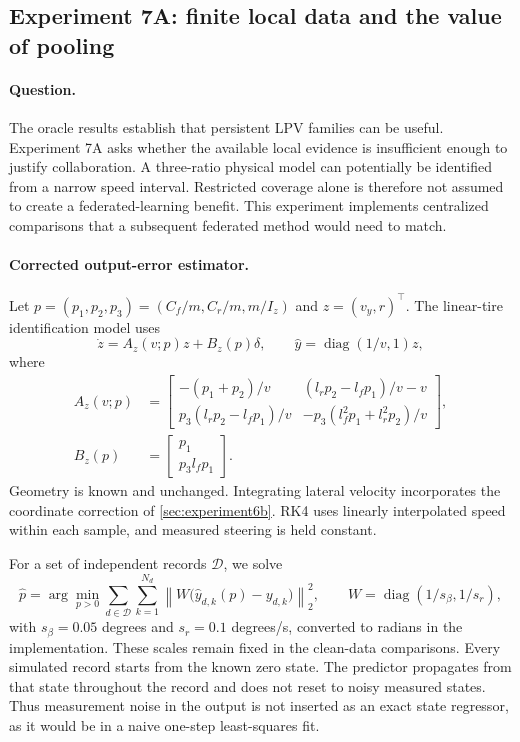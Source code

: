 \subsection{Experiment 7A: finite local data and the value of pooling}
\label{sec:experiment7a}

\paragraph{Question.}
The oracle results establish that persistent LPV families can be useful.
Experiment 7A asks whether the available local evidence is insufficient enough
to justify collaboration. A three-ratio physical model can potentially be
identified from a narrow speed interval. Restricted coverage alone is therefore
not assumed to create a federated-learning benefit. This experiment implements
centralized comparisons that a subsequent federated method would need to match.

\paragraph{Corrected output-error estimator.}
Let $p=(p_1,p_2,p_3)=(C_f/m,C_r/m,m/I_z)$ and $z=(v_y,r)^\top$. The linear-tire
identification model uses
\begin{equation}
 \dot z=A_z(v;p)z+B_z(p)\delta,\qquad
 \hat y=\operatorname{diag}(1/v,1)z,
\end{equation}
where
\begin{align}
 A_z(v;p)&=\begin{bmatrix}
 -(p_1+p_2)/v &(l_rp_2-l_fp_1)/v-v\\
 p_3(l_rp_2-l_fp_1)/v &-p_3(l_f^2p_1+l_r^2p_2)/v
 \end{bmatrix},\\
 B_z(p)&=\begin{bmatrix}p_1\\p_3l_fp_1\end{bmatrix}.
\end{align}
Geometry is known and unchanged. Integrating lateral velocity incorporates
the coordinate correction of \cref{sec:experiment6b}. RK4 uses linearly
interpolated speed within each sample, and measured steering is held constant.

For a set of independent records $\mathcal D$, we solve
\begin{equation}
 \hat p=\arg\min_{p>0}\sum_{d\in\mathcal D}\sum_{k=1}^{N_d}
 \left\|W\big(\hat y_{d,k}(p)-y_{d,k}\big)\right\|_2^2,
 \qquad W=\operatorname{diag}(1/s_\beta,1/s_r),
\end{equation}
with $s_\beta=0.05$ degrees and $s_r=0.1$ degrees/s, converted to radians in
the implementation. These scales remain fixed in the clean-data comparisons.
Every simulated record starts from the known zero state. The predictor
propagates from that state throughout the record and does not reset to noisy
measured states. Thus measurement noise in the output is not inserted as an
exact state regressor, as it would be in a naive one-step least-squares fit.

